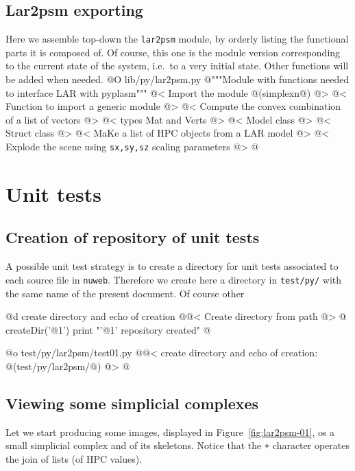 \documentclass[11pt,oneside]{article}	%
\begin{document}
\subsection{Lar2psm exporting}
\label{sec:lar2psm}
Here we assemble top-down the \texttt{lar2psm} module, by orderly listing the functional parts it is composed of. Of course, this one is the module version corresponding to the current state of the system, i.e.~to a very initial state. Other functions will be added when needed.
@O lib/py/lar2psm.py
@{"""Module with functions needed to interface LAR with pyplasm"""
@< Import the module @(simplexn@) @>
@< Function to import a generic module @>
@< Compute the convex combination of a list of vectors @>
@< types Mat and Verts @>
@< Model class @>
@< Struct class @>
@< MaKe a list of HPC objects from a LAR model @>
@< Explode the scene using \texttt{sx,sy,sz} scaling parameters @>
@}


\section{Unit tests}

\subsection{Creation of repository of unit tests}

A possible unit test strategy is to create a directory for unit tests associated to each source file in \texttt{nuweb}. Therefore we create here a directory in \texttt{test/py/} with the same name of the present document. Of course other 

@d create directory and echo of creation
@{@< Create directory from path @>
@%
createDir('@1')
print "'@1' repository created"
@}

@o test/py/lar2psm/test01.py
@{@< create directory  and echo of creation: @(test/py/lar2psm/@) @>
@}


\subsection{Viewing some simplicial complexes}
Let we start producing some images, displayed in Figure~\ref{fig:lar2psm-01}, os a small simplicial complex and of its skeletons. Notice that the \texttt{+} character operates the join of lists (of HPC values).
\end{document}
